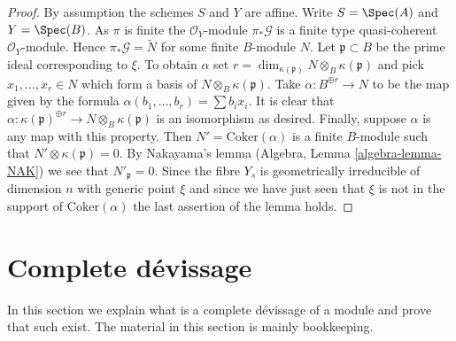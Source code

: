 \begin{proof}
By assumption the schemes $S$ and $Y$ are affine.
Write $S = \Spec(A)$ and $Y = \Spec(B)$.
As $\pi$ is finite the $\mathcal{O}_Y$-module $\pi_*\mathcal{G}$
is a finite type quasi-coherent $\mathcal{O}_Y$-module.
Hence $\pi_*\mathcal{G} = \widetilde{N}$ for some finite $B$-module $N$.
Let $\mathfrak p \subset B$ be the prime ideal corresponding to $\xi$.
To obtain $\alpha$ set
$r = \dim_{\kappa(\mathfrak p)} N \otimes_B \kappa(\mathfrak p)$
and pick $x_1, \ldots, x_r \in N$ which form a basis of
$N \otimes_B \kappa(\mathfrak p)$. Take $\alpha : B^{\oplus r} \to N$
to be the map given by the formula $\alpha(b_1, \ldots, b_r) = \sum b_ix_i$.
It is clear that
$\alpha : \kappa(\mathfrak p)^{\oplus r} \to N \otimes_B \kappa(\mathfrak p)$
is an isomorphism as desired. Finally, suppose $\alpha$ is any map with this
property. Then $N' = \text{Coker}(\alpha)$ is a finite $B$-module
such that $N' \otimes \kappa(\mathfrak p) = 0$. By Nakayama's lemma
(Algebra, Lemma \ref{algebra-lemma-NAK})
we see that $N'_{\mathfrak p} = 0$. Since the fibre $Y_s$ is
geometrically irreducible of dimension $n$ with generic point $\xi$
and since we have just seen that $\xi$ is not in the support of
$\text{Coker}(\alpha)$ the last assertion of the lemma holds.
\end{proof}


\section{Complete d\'evissage}
\label{section-complete-devissage}

\noindent
In this section we explain what is a complete d\'evissage of a
module and prove that such exist. The material in this
section is mainly bookkeeping.

